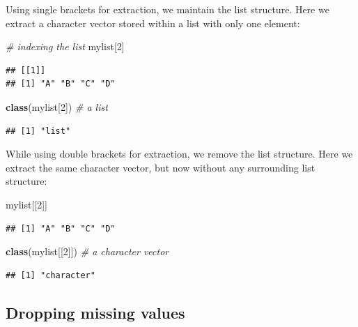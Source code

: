 \documentclass[
]{book}
\newenvironment{Shaded}{\begin{snugshade}}{\end{snugshade}}
\newcommand{\CommentTok}[1]{\textcolor[rgb]{0.56,0.35,0.01}{\textit{#1}}}
\newcommand{\DecValTok}[1]{\textcolor[rgb]{0.00,0.00,0.81}{#1}}
\newcommand{\KeywordTok}[1]{\textcolor[rgb]{0.13,0.29,0.53}{\textbf{#1}}}
\newcommand{\NormalTok}[1]{#1}
\begin{document}
Using single brackets for extraction, we maintain the list structure. Here we extract a character vector stored within a list with only one element:

\begin{Shaded}
\begin{Highlighting}[]
\CommentTok{\# indexing the list}
\NormalTok{mylist[}\DecValTok{2}\NormalTok{]}
\end{Highlighting}
\end{Shaded}

\begin{verbatim}
## [[1]]
## [1] "A" "B" "C" "D"
\end{verbatim}

\begin{Shaded}
\begin{Highlighting}[]
\KeywordTok{class}\NormalTok{(mylist[}\DecValTok{2}\NormalTok{]) }\CommentTok{\# a list}
\end{Highlighting}
\end{Shaded}

\begin{verbatim}
## [1] "list"
\end{verbatim}

While using double brackets for extraction, we remove the list structure. Here we extract the same character vector, but now without any surrounding list structure:

\begin{Shaded}
\begin{Highlighting}[]
\NormalTok{mylist[[}\DecValTok{2}\NormalTok{]]}
\end{Highlighting}
\end{Shaded}

\begin{verbatim}
## [1] "A" "B" "C" "D"
\end{verbatim}

\begin{Shaded}
\begin{Highlighting}[]
\KeywordTok{class}\NormalTok{(mylist[[}\DecValTok{2}\NormalTok{]]) }\CommentTok{\# a character vector}
\end{Highlighting}
\end{Shaded}

\begin{verbatim}
## [1] "character"
\end{verbatim}

\hypertarget{dropping-missing-values}{%
\subsection{Dropping missing values}\label{dropping-missing-values}}
\end{document}
